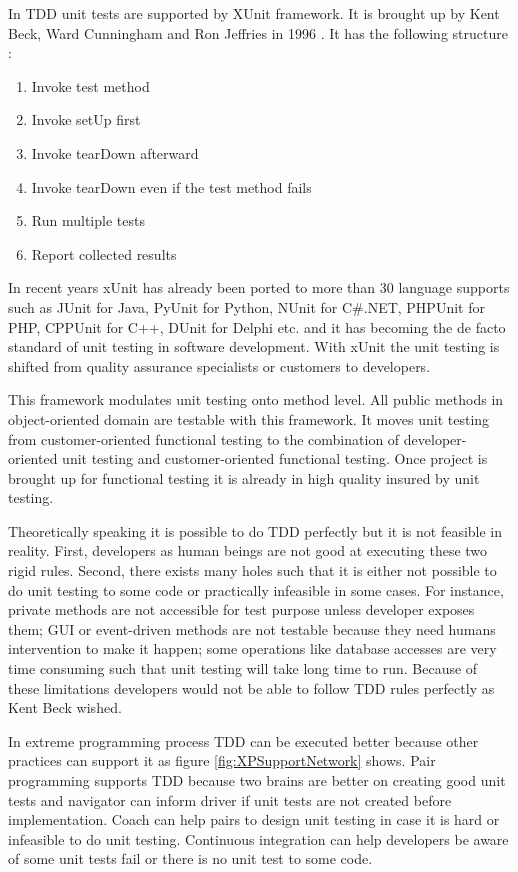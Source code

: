 In TDD unit tests are supported by XUnit framework. It is brought up by
Kent Beck, Ward Cunningham and Ron Jeffries in 1996 \cite{XP96}. It has the
following structure \cite{Beck:03}:

\begin{enumerate}
\item Invoke test method
\item Invoke setUp first
\item Invoke tearDown afterward
\item Invoke tearDown even if the test method fails
\item Run multiple tests
\item Report collected results
\end{enumerate}

In recent years xUnit has already been ported to more than 30 language
supports such as JUnit for Java, PyUnit for Python, NUnit for C\#.NET,
PHPUnit for PHP, CPPUnit for C++, DUnit for Delphi etc. \cite{XPSoftware}
and it has becoming the de facto standard of unit testing in software
development. With xUnit the unit testing is shifted from quality assurance
specialists or customers to developers.

This framework modulates unit testing onto method level. All public methods
in object-oriented domain are testable with this framework. It moves unit
testing from customer-oriented functional testing to the combination of
developer-oriented unit testing and customer-oriented functional testing.
Once project is brought up for functional testing it is already in high
quality insured by unit testing.

Theoretically speaking it is possible to do TDD perfectly but it is not
feasible in reality. First, developers as human beings are not good at
executing these two rigid rules. Second, there exists many holes such that
it is either not possible to do unit testing to some code or practically
infeasible in some cases. For instance, private methods are not accessible
for test purpose unless developer exposes them; GUI or event-driven methods
are not testable because they need humans intervention to make it happen;
some operations like database accesses are very time consuming such that unit
testing will take long time to run. Because of these limitations developers
would  not be able to follow TDD rules perfectly as Kent Beck wished.

In extreme programming process TDD can be executed better because other
practices can support it as figure \ref{fig:XPSupportNetwork} shows. Pair
programming supports TDD because two brains are better on creating good
unit tests and navigator can inform driver if unit tests are not created
before implementation. Coach can help pairs to design unit testing in case
it is hard or infeasible to do unit testing. Continuous integration can
help developers be aware of some unit tests fail or there is no unit test
to some code.



